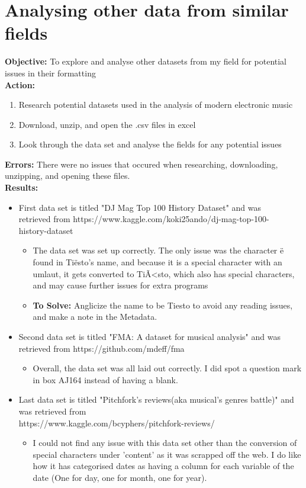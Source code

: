 \documentclass{article}
\begin{document}
\section{Analysing other data from similar fields}
\textbf{Objective:} To explore and analyse other datasets from my field for potential issues in their formatting\\
\textbf{Action:}
\begin{enumerate}
    \item Research potential datasets used in the analysis of modern electronic music
    \item Download, unzip, and open the .csv files in excel
    \item Look through the data set and analyse the fields for any potential issues
\end{enumerate}
\textbf{Errors:} There were no issues that occured when researching, downloading, unzipping, and opening these files. \\
\textbf{Results:}
\begin{itemize}
    \item First data set is titled "DJ Mag Top 100 History Dataset" and was \\ retrieved from https://www.kaggle.com/koki25ando/dj-mag-top-100-\\history-dataset
    \begin{itemize}
        \item  The data set was set up correctly. The only issue was the character ë found in Tiësto's name, and because it is a special character with an umlaut, it gets converted to TiÃ<sto, which also has special characters, and may cause further issues for extra programs
        \item \textbf{To Solve:} Anglicize the name to be Tiesto to avoid any reading issues, and make a note in the Metadata.
    \end{itemize}
    \item Second data set is titled "FMA: A dataset for musical analysis" and was retrieved from https://github.com/mdeff/fma
    \begin{itemize}
        \item Overall, the data set was all laid out correctly. I did spot a question mark in box AJ164 instead of having a blank.
    \end{itemize}
    \item Last data set is titled "Pitchfork's reviews(aka musical's genres battle)" and was retrieved from \\https://www.kaggle.com/bcyphers/pitchfork-reviews/
    \begin{itemize}
        \item I could not find any issue with this data set other than the conversion of special characters under 'content' as it was scrapped off the web. I do like how it has categorised dates as having a column for each variable of the date (One for day, one for month, one for year).
    \end{itemize}
\end{itemize}
\newpage
\end{document}
